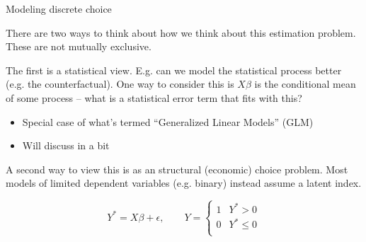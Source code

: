 \documentclass[notes,11pt, aspectratio=169]{beamer}
\newenvironment{wideitemize}{\itemize\addtolength{\itemsep}{10pt}}{\enditemize}
\begin{document}
\begin{frame}{Modeling discrete choice}
  \begin{wideitemize}
    \item  There are two ways to think about how we think about this estimation problem. These
  are not mutually exclusive.
\item The first is a statistical view. E.g. can we model the
  statistical process better (e.g. the counterfactual). One way to
  consider this is $X\beta$ is the conditional mean of some process --
  what is a statistical error term that fits with this?
  \begin{itemize}
  \item Special case of what's termed ``Generalized Linear Models'' (GLM)
  \item Will discuss in a bit
  \end{itemize}
\item   A second way to view this is as an structural (economic) choice
  problem.  Most models of limited dependent variables (e.g. binary)
  instead assume a latent index. 

  $$Y^{*} = X\beta + \epsilon, \qquad Y = 
  \begin{cases}
    1 & Y^{*}>0\\
    0 & Y^{*} \leq 0\\
  \end{cases}
  $$

  \end{wideitemize}

\end{frame}
\end{document}
